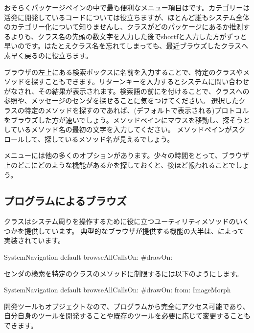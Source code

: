 \documentclass[a4paper,10pt,twoside]{book}
\begin{document}
おそらくパッケージペインの中で最も便利なメニュー項目はです。カテゴリーは活発に開発しているコードについては役立ちますが、ほとんど誰もシステム全体のカテゴリー化について知りませんし、クラスがどのパッケージにあるか推測するよりも、クラス名の先頭の数文字を入力した後でshort{f}と入力した方がずっと早いのです。はたとえクラス名を忘れてしまっても、最近ブラウズしたクラスへ素早く戻るのに役立ちます。

ブラウザの左上にある検索ボックスに名前を入力することで、特定のクラスやメソッドを探すこともできます。リターンキーを入力するとシステムに問い合わせがなされ、その結果が表示されます。検索語の前に\ct{#}を付けることで、クラスへの参照や、メッセージのセンダを探せることに気をつけてください。
選択したクラスの特定のメソッドを探すのであれば、(デフォルトで表示される)プロトコルをブラウズした方が速いでしょう。メソッドペインにマウスを移動し、探そうとしているメソッド名の最初の文字を入力してください。
メソッドペインがスクロールして、探しているメソッド名が見えるでしょう。


メニューには他の多くのオプションがあります。少々の時間をとって、ブラウザ上のどこにどのような機能があるかを探しておくと、後ほど報われることでしょう。


\subsection{プログラムによるブラウズ}

クラスはシステム周りを操作するために役に立つユーティリティメソッドのいくつかを提供しています。
典型的なブラウザが提供する機能の大半は、によって実装されています。

\begin{code}{}
SystemNavigation default browseAllCallsOn: #drawOn:
\end{code}
センダの検索を特定のクラスのメソッドに制限するには以下のようにします。
\begin{code}{}
SystemNavigation default browseAllCallsOn: #drawOn: from: ImageMorph
\end{code}
開発ツールもオブジェクトなので、プログラムから完全にアクセス可能であり、自分自身のツールを開発することや既存のツールを必要に応じて変更することもできます。
\end{document}
